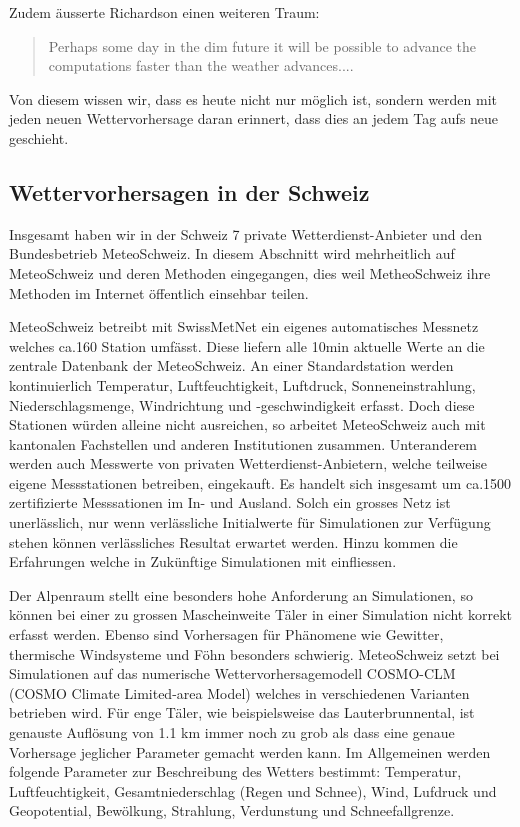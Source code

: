 \begin{refsection}
Zudem äusserte Richardson einen weiteren Traum:
\begin{quote}
Perhaps some day in the dim future it will be possible to advance the computations faster than the weather advances....
\end{quote}
Von diesem wissen wir, dass es heute nicht nur möglich ist, sondern werden mit jeden neuen Wettervorhersage daran erinnert, dass dies an jedem Tag aufs neue geschieht.



\subsection{Wettervorhersagen in der Schweiz
\label{section:klima:wettervorhersagen}}

Insgesamt haben wir in der Schweiz 7 private Wetterdienst-Anbieter und den Bundesbetrieb MeteoSchweiz. In diesem Abschnitt wird mehrheitlich auf MeteoSchweiz und deren Methoden eingegangen, dies weil MetheoSchweiz ihre Methoden im Internet öffentlich einsehbar teilen.

MeteoSchweiz betreibt mit SwissMetNet ein eigenes automatisches Messnetz welches ca.160 Station umfässt. Diese liefern alle 10min aktuelle Werte an die zentrale Datenbank der MeteoSchweiz. An einer Standardstation werden kontinuierlich Temperatur, Luftfeuchtigkeit, Luftdruck, Sonneneinstrahlung, Niederschlagsmenge, Windrichtung und -geschwindigkeit erfasst. Doch diese Stationen würden alleine nicht ausreichen, so arbeitet MeteoSchweiz auch mit kantonalen Fachstellen und anderen Institutionen zusammen. Unteranderem werden auch Messwerte von privaten Wetterdienst-Anbietern, welche teilweise eigene Messstationen betreiben, eingekauft. Es handelt sich insgesamt um ca.1500 zertifizierte Messsationen im In- und Ausland. Solch ein grosses Netz ist unerlässlich, nur wenn verlässliche Initialwerte für Simulationen zur Verfügung stehen können verlässliches Resultat erwartet werden. Hinzu kommen die Erfahrungen welche in Zukünftige Simulationen mit einfliessen. \cite{klima:meteoschweiz} 

Der Alpenraum stellt eine besonders hohe Anforderung an Simulationen, so können bei einer zu grossen Mascheinweite Täler in einer Simulation nicht korrekt erfasst werden. Ebenso sind Vorhersagen  für Phänomene wie Gewitter, thermische Windsysteme und Föhn besonders schwierig. MeteoSchweiz setzt bei Simulationen auf das numerische Wettervorhersagemodell COSMO-CLM (COSMO Climate Limited-area Model) welches in verschiedenen Varianten betrieben wird. Für enge Täler, wie beispielsweise das Lauterbrunnental, ist genauste Auflösung von 1.1 km immer noch zu grob als dass eine genaue Vorhersage jeglicher Parameter gemacht werden kann.
Im Allgemeinen werden folgende Parameter zur Beschreibung des Wetters bestimmt: Temperatur, Luftfeuchtigkeit, Gesamtniederschlag (Regen und Schnee), Wind, Lufdruck und Geopotential, Bewölkung, Strahlung, Verdunstung und Schneefallgrenze.


\end{refsection}
